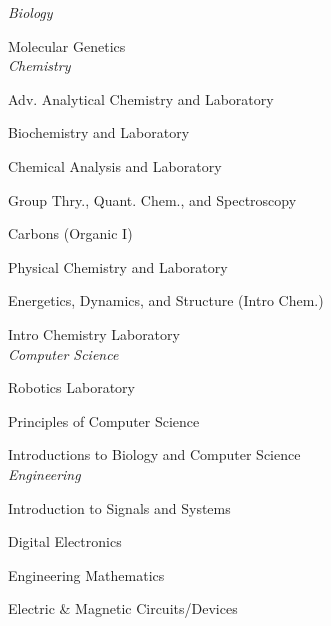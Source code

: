 \documentclass[9pt]{article}
\begin{document}
\begin{multicols}{2}
\vfill \columnbreak
\vspace{3mm}
\noindent
{\it Biology} \\
\par Molecular Genetics \\

\vspace{3mm}
\noindent
{\it Chemistry} \\
\par Adv. Analytical Chemistry and Laboratory \\
\par Biochemistry and Laboratory \\
\par Chemical Analysis and Laboratory \\
\par Group Thry., Quant. Chem., and Spectroscopy \\
\par Carbons (Organic I) \\
\par Physical Chemistry and Laboratory \\ 
\par Energetics, Dynamics, and Structure (Intro Chem.) \\
\par Intro Chemistry Laboratory \\

\vspace{3mm}
\noindent
{\it Computer Science} \\
\par Robotics Laboratory \\
\par Principles of Computer Science \\
\par Introductions to Biology and Computer Science \\

\vspace{3mm}
\noindent
{\it Engineering} \\
\par Introduction to Signals and Systems \\
\par Digital Electronics \\
\par Engineering Mathematics \\
\par Electric \& Magnetic Circuits/Devices \\

\end{multicols}
\end{document}

